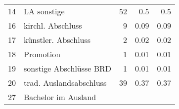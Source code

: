 \begin{longtable}{lXrrr}
     14 &
     \multicolumn{1}{X}{ LA sonstige   } &


       \num{52} &
       \num[round-mode=places,round-precision=2]{0.5} &
         \num[round-mode=places,round-precision=2]{0.5} \\

     16 &
     \multicolumn{1}{X}{ kirchl. Abschluss   } &


       \num{9} &
       \num[round-mode=places,round-precision=2]{0.09} &
         \num[round-mode=places,round-precision=2]{0.09} \\

     17 &
     \multicolumn{1}{X}{ künstler. Abschluss   } &


       \num{2} &
       \num[round-mode=places,round-precision=2]{0.02} &
         \num[round-mode=places,round-precision=2]{0.02} \\

     18 &
     \multicolumn{1}{X}{ Promotion   } &


       \num{1} &
       \num[round-mode=places,round-precision=2]{0.01} &
         \num[round-mode=places,round-precision=2]{0.01} \\

     19 &
     \multicolumn{1}{X}{ sonstige Abschlüsse BRD   } &


       \num{1} &
       \num[round-mode=places,round-precision=2]{0.01} &
         \num[round-mode=places,round-precision=2]{0.01} \\

     20 &
     \multicolumn{1}{X}{ trad. Auslandsabschluss   } &


       \num{39} &
       \num[round-mode=places,round-precision=2]{0.37} &
         \num[round-mode=places,round-precision=2]{0.37} \\

     27 &
     \multicolumn{1}{X}{ Bachelor im Ausland   } &



\end{longtable}
